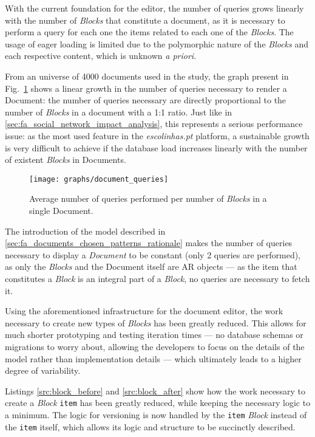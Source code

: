 
With the current foundation for the editor, the number of queries grows linearly with the number of \emph{Blocks} that constitute a document, as it is necessary to perform a query for each one the items related to each one of the \emph{Blocks}. The usage of eager loading is limited due to the polymorphic nature of the \emph{Blocks} and each respective content, which is unknown \emph{a priori}.

From an universe of 4000 documents used in the study, the graph present in Fig.~\ref{fig:queries_per_blocks_in_document} shows a linear growth in the number of queries necessary to render a Document: the number of queries necessary are directly proportional to the number of \emph{Blocks} in a document with a 1:1 ratio. Just like in \ref{sec:fa_social_network_impact_analysis}, this represents a serious performance issue: as the most used feature in the \emph{escolinhas.pt} platform, a sustainable growth is very difficult to achieve if the database load increases linearly with the number of existent \emph{Blocks} in Documents.

\begin{figure}[htb]
  \centering
  \texttt{[image: graphs/document\_queries]}
  \caption{Average number of queries performed per number of \emph{Blocks} in a single Document.}
  \label{fig:queries_per_blocks_in_document}
\end{figure}

The introduction of the model described in \ref{sec:fa_documents_chosen_patterns_rationale} makes the number of queries necessary to display a \emph{Document} to be constant (only 2 queries are performed), as only the \emph{Blocks} and the Document itself are AR objects --- as the item that constitutes a \emph{Block} is an integral part of a \emph{Block}, no queries are necessary to fetch it.


Using the aforementioned infrastructure for the document editor, the work necessary to create new types of \emph{Blocks} has been greatly reduced. This allows for much shorter prototyping and testing iteration times --- no database schemas or migrations to worry about, allowing the developers to focus on the details of the model rather than implementation details --- which ultimately leads to a higher degree of variability.

Listings \ref{src:block_before} and \ref{src:block_after} show how the work necessary to create a \emph{Block} \texttt{item} has been greatly reduced, while keeping the necessary logic to a minimum. The logic for versioning is now handled by the \texttt{item} \emph{Block} instead of the \texttt{item} itself, which allows its logic and structure to be succinctly described.


